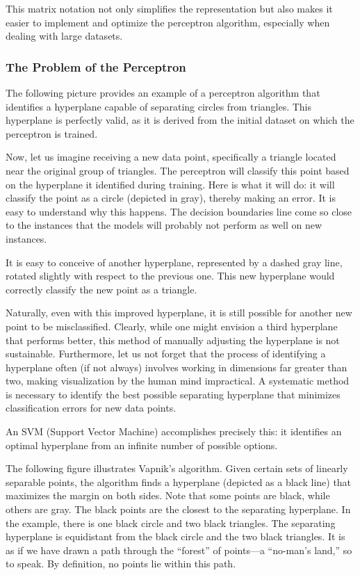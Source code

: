 \documentclass[11pt]{article}
\begin{document}
This matrix notation not only simplifies the representation but also
makes it easier to implement and optimize the perceptron algorithm,
especially when dealing with large datasets.

    \subsubsection{The Problem of the
Perceptron}\label{the-problem-of-the-perceptron}

    The following picture provides an example of a perceptron algorithm that
identifies a hyperplane capable of separating circles from triangles.
This hyperplane is perfectly valid, as it is derived from the initial
dataset on which the perceptron is trained.

    

    Now, let us imagine receiving a new data point, specifically a triangle
located near the original group of triangles. The perceptron will
classify this point based on the hyperplane it identified during
training. Here is what it will do: it will classify the point as a
circle (depicted in gray), thereby making an error. It is easy to
understand why this happens. The decision boundaries line come so close
to the instances that the models will probably not perform as well on
new instances.

    

    It is easy to conceive of another hyperplane, represented by a dashed
gray line, rotated slightly with respect to the previous one. This new
hyperplane would correctly classify the new point as a triangle.

Naturally, even with this improved hyperplane, it is still possible for
another new point to be misclassified. Clearly, while one might envision
a third hyperplane that performs better, this method of manually
adjusting the hyperplane is not sustainable. Furthermore, let us not
forget that the process of identifying a hyperplane often (if not
always) involves working in dimensions far greater than two, making
visualization by the human mind impractical. A systematic method is
necessary to identify the best possible separating hyperplane that
minimizes classification errors for new data points.

    

    An SVM (Support Vector Machine) accomplishes precisely this: it
identifies an optimal hyperplane from an infinite number of possible
options.

The following figure illustrates Vapnik's algorithm. Given certain sets
of linearly separable points, the algorithm finds a hyperplane (depicted
as a black line) that maximizes the margin on both sides. Note that some
points are black, while others are gray. The black points are the
closest to the separating hyperplane. In the example, there is one black
circle and two black triangles. The separating hyperplane is equidistant
from the black circle and the two black triangles. It is as if we have
drawn a path through the ``forest'' of points---a ``no-man's land,'' so
to speak. By definition, no points lie within this path.
\end{document}
